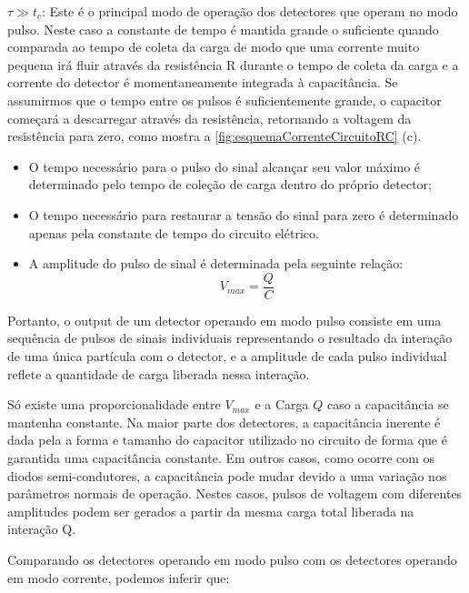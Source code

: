 \documentclass[11pt,a4paper]{article}
\begin{document}
			$\tau \gg t_c$: Este é o principal modo de operação dos detectores que operam no modo pulso. Neste caso a constante de tempo é mantida grande o suficiente quando comparada ao tempo de coleta da carga de modo que uma corrente muito pequena irá fluir através da resistência R durante o tempo de coleta da carga e a corrente do detector é momentaneamente integrada à capacitância. Se assumirmos que o tempo entre os pulsos é suficientemente grande, o capacitor começará a descarregar através da resistência, retornando a voltagem da resistência para zero, como mostra a  \ref{fig:esquemaCorrenteCircuitoRC} (c).


			\begin{itemize}
				\item O tempo necessário para o pulso do sinal alcançar seu valor máximo é determinado pelo tempo de coleção de carga dentro do próprio detector;
				\item O tempo necessário para restaurar a tensão do sinal para zero é determinado apenas pela constante de tempo do circuito elétrico.
				\item A amplitude do pulso de sinal é determinada pela seguinte relação:
					\begin{equation}
						V_{max} = \frac{Q}{C}
					\end{equation}
			\end{itemize}

			Portanto, o output de um detector operando em modo pulso consiste em uma sequência de pulsos de sinais individuais representando o resultado da interação de uma única partícula com o detector, e a amplitude de cada pulso individual reflete a quantidade de carga liberada nessa interação.

			Só existe uma proporcionalidade entre $V_{max}$ e a Carga $Q$ caso a capacitância se mantenha constante. Na maior parte dos detectores, a capacitância inerente é dada pela a forma e tamanho do capacitor utilizado no circuito de forma que é garantida uma capacitância constante. Em outros casos, como ocorre com os diodos semi-condutores, a capacitância pode mudar devido a uma variação nos parâmetros normais de operação. Nestes casos, pulsos de voltagem com diferentes amplitudes podem ser gerados a partir da mesma carga total liberada na interação Q. 

			Comparando os detectores operando em modo pulso com os detectores operando em modo corrente, podemos inferir que:
\end{document}
